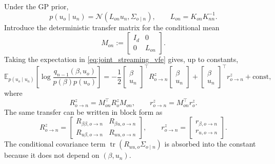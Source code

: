 \documentclass[12pt]{article}
\newcommand{\E}{\mathbb{E}}
\newcommand{\tr}{\operatorname{tr}}
\begin{document}
Under the GP prior,
\begin{equation}
    p(u_o\mid u_n)
    =
    \mathcal{N}(L_{on}u_n,\Sigma_{o\mid n}),
    \qquad
    L_{on}=K_{on}K_{nn}^{-1}.
    \label{eq:joint_old_given_new}
\end{equation}
Introduce the deterministic transfer matrix for the conditional mean
\begin{equation}
    M_{on}
    :=
    \begin{bmatrix}
        I_d & 0\\
        0 & L_{on}
    \end{bmatrix}.
    \label{eq:joint_transfer_matrix}
\end{equation}
Taking the expectation in \eqref{eq:joint_streaming_vfe} gives, up to constants,
\begin{equation}
    \E_{p(u_o\mid u_n)}
    \left[
        \log
        \frac{q_{n-1}(\beta,u_o)}{p(\beta)p(u_o)}
    \right]
    =
    -\frac{1}{2}
    \begin{bmatrix}\beta\\u_n\end{bmatrix}^{\!\top}
    R_{o\rightarrow n}^z
    \begin{bmatrix}\beta\\u_n\end{bmatrix}
    +
    \begin{bmatrix}\beta\\u_n\end{bmatrix}^{\!\top}
    r_{o\rightarrow n}^z
    +\mathrm{const},
\end{equation}
where
\begin{equation}
    R_{o\rightarrow n}^z=M_{on}^\top R_o^zM_{on},
    \qquad
    r_{o\rightarrow n}^z=M_{on}^\top r_o^z .
    \label{eq:joint_old_transfer_natural_compact}
\end{equation}
The same transfer can be written in block form as
\begin{equation}
    R_{o\rightarrow n}^z
    =
    \begin{bmatrix}
        R_{\beta\beta,o\rightarrow n} & R_{\beta u,o\rightarrow n}\\
        R_{u\beta,o\rightarrow n} & R_{uu,o\rightarrow n}
    \end{bmatrix},
    \qquad
    r_{o\rightarrow n}^z
    =
    \begin{bmatrix}
        r_{\beta,o\rightarrow n}\\
        r_{u,o\rightarrow n}
    \end{bmatrix}.
    \label{eq:joint_old_transfer_blocks_matrix}
\end{equation}
The conditional covariance term
$\tr(R_{uu,o}\Sigma_{o\mid n})$ is absorbed into the constant because it does not
depend on $(\beta,u_n)$.
\end{document}
